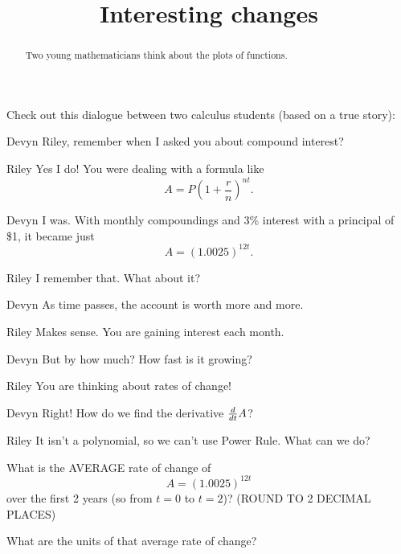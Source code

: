 \documentclass{ximera}
\title[Break-Ground:]{Interesting changes}
\begin{document}
\begin{abstract}
  Two young mathematicians think about the plots of functions.
\end{abstract}
\maketitle

Check out this dialogue between two calculus students (based on a true
story):

\begin{dialogue}
\item[Devyn] Riley, remember when I asked you about compound interest?
\item[Riley] Yes I do!  You were dealing with a formula like \[ A = P\left( 1 + \dfrac{r}{n} \right)^{nt}.\]
\item[Devyn] I was.  With monthly compoundings and 3\% interest with a principal of \$1, it became just
			\[ A = (1.0025)^{12t}.\]
\item[Riley] I remember that. What about it?
\item[Devyn] As time passes, the account is worth more and more.
\item[Riley] Makes sense.  You are gaining interest each month.
\item[Devyn] But by how much?  How fast is it growing?
\item[Riley] You are thinking about rates of change!  
\item[Devyn] Right!  How do we find the derivative $\frac{d}{\mathop{}\!d t}{A}$?
\item[Riley] It isn't a polynomial, so we can't use Power Rule.  What can we do?

\end{dialogue}

\begin{problem}
  What is the AVERAGE rate of change of \[A = (1.0025)^{12t}\] over the first 2 years (so from $t=0$ to $t=2$)?  (ROUND TO 2 DECIMAL PLACES)
  \begin{multipleChoice}
  \end{multipleChoice}
\end{problem}

\begin{problem}
  What are the units of that average rate of change?
    \begin{multipleChoice}
  \end{multipleChoice}
\end{problem}


\end{document}
